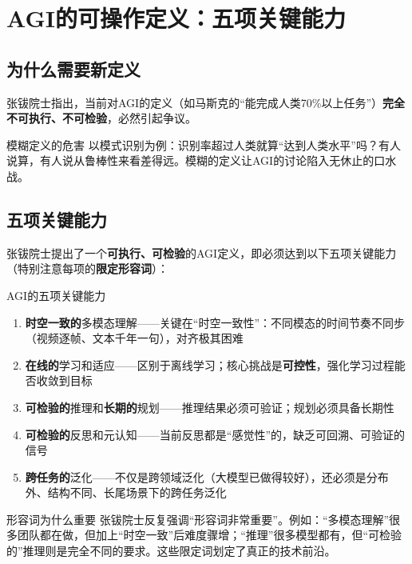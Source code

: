 \section{AGI的可操作定义：五项关键能力}

\subsection{为什么需要新定义}

张钹院士指出，当前对AGI的定义（如马斯克的``能完成人类70\%以上任务''）\textbf{完全不可执行、不可检验}，必然引起争议。

\begin{warningbox}{模糊定义的危害}
以模式识别为例：识别率超过人类就算``达到人类水平''吗？有人说算，有人说从鲁棒性来看差得远。模糊的定义让AGI的讨论陷入无休止的口水战。
\end{warningbox}

\subsection{五项关键能力}

张钹院士提出了一个\textbf{可执行、可检验}的AGI定义，即必须达到以下五项关键能力（特别注意每项的\textbf{限定形容词}）：

\begin{importantbox}{AGI的五项关键能力}
\begin{enumerate}
\item \textbf{时空一致的}多模态理解——关键在``时空一致性''：不同模态的时间节奏不同步（视频逐帧、文本千年一句），对齐极其困难
\item \textbf{在线的}学习和适应——区别于离线学习；核心挑战是\textbf{可控性}，强化学习过程能否收敛到目标
\item \textbf{可检验的}推理和\textbf{长期的}规划——推理结果必须可验证；规划必须具备长期性
\item \textbf{可检验的}反思和元认知——当前反思都是``感觉性''的，缺乏可回溯、可验证的信号
\item \textbf{跨任务的}泛化——不仅是跨领域泛化（大模型已做得较好），还必须是分布外、结构不同、长尾场景下的跨任务泛化
\end{enumerate}
\end{importantbox}

\begin{knowledgebox}{形容词为什么重要}
张钹院士反复强调``形容词非常重要''。例如：``多模态理解''很多团队都在做，但加上``时空一致''后难度骤增；``推理''很多模型都有，但``可检验的''推理则是完全不同的要求。这些限定词划定了真正的技术前沿。
\end{knowledgebox}


